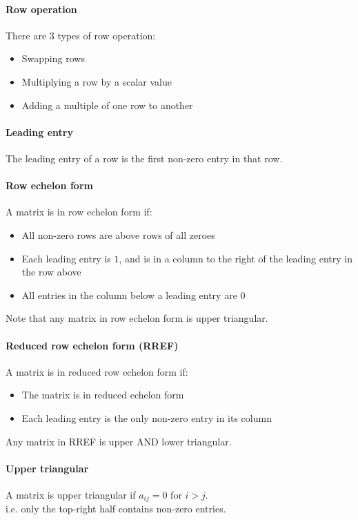 \documentclass{scrartcl}
\begin{document}
\paragraph{Row operation}
There are 3 types of row operation:
\begin{itemize}
\item Swapping rows
\item Multiplying a row by a scalar value
\item Adding a multiple of one row to another
\end{itemize}

\paragraph{Leading entry}
The leading entry of a row is the first non-zero entry in that row.

\paragraph{Row echelon form}
A matrix is in row echelon form if:
\begin{itemize}
\item All non-zero rows are above rows of all zeroes
\item Each leading entry is $ 1 $, and is in a column to the right of the leading entry in the row above
\item All entries in the column below a leading entry are $ 0 $
\end{itemize}
Note that any matrix in row echelon form is upper triangular.

\paragraph{Reduced row echelon form (RREF)}
A matrix is in reduced row echelon form if:
\begin{itemize}
\item The matrix is in reduced echelon form
\item Each leading entry is the only non-zero entry in its column
\end{itemize}
Any matrix in RREF is upper AND lower triangular.

\paragraph{Upper triangular}
A matrix is upper triangular if $ a_{ij} = 0 $ for $ i > j $.
\\
i.e. only the top-right half contains non-zero entries.
\end{document}
